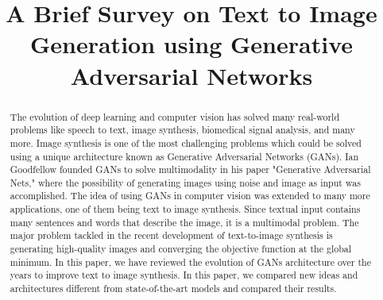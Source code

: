 \documentclass[conference]{IEEEtran}
\begin{document}
	
	\title{A Brief Survey on Text to Image Generation using Generative Adversarial Networks\\
	}
	
	\author{
		\and
		\and
	}
	
	\maketitle
	
	\begin{abstract}
	The evolution of deep learning and computer vision has solved many real-world problems like speech to text, image synthesis, biomedical signal analysis, and many more. Image synthesis is one of the most challenging problems which could be solved using a unique architecture known as Generative Adversarial Networks (GANs). Ian Goodfellow founded GANs to solve multimodality in his paper "Generative Adversarial Nets," \cite{b1} where the possibility of generating images using noise and image as input was accomplished. The idea of using GANs in computer vision was extended to many more applications, one of them being text to image synthesis. Since textual input contains many sentences and words that describe the image, it is a multimodal problem. The major problem tackled in the recent development of text-to-image synthesis is generating high-quality images and converging the objective function at the global minimum. In this paper, we have reviewed the evolution of GANs architecture over the years to improve text to image synthesis. In this paper, we compared new ideas and architectures different from state-of-the-art models and compared their results.
	\end{abstract}
	
\end{document}
